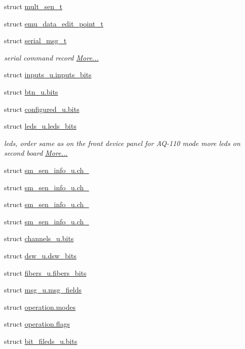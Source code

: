 \begin{DoxyCompactItemize}
struct \hyperlink{a00001_db/ddf/a00088}{mult\+\_\+sen\+\_\+t}
\item 
struct \hyperlink{a00001_dc/ddf/a00067}{emu\+\_\+data\+\_\+edit\+\_\+point\+\_\+t}
\item 
struct \hyperlink{a00001_df/dc8/a00122}{serial\+\_\+msg\+\_\+t}
\begin{DoxyCompactList}\small\item\em serial command record  \hyperlink{a00001_df/dc8/a00122}{More...}\end{DoxyCompactList}\item 
struct \hyperlink{a00001_d2/d1f/a00083}{inputs\+\_\+u.\+inputs\+\_\+bits}
\item 
struct \hyperlink{a00001_d3/d8b/a00059}{btn\+\_\+u.\+bits}
\item 
struct \hyperlink{a00001_d1/d6f/a00063}{configured\+\_\+u.\+bits}
\item 
struct \hyperlink{a00001_df/d13/a00085}{leds\+\_\+u.\+leds\+\_\+bits}
\begin{DoxyCompactList}\small\item\em leds, order same as on the front device panel for A\+Q-\/110 mode more leds on second board  \hyperlink{a00001_df/d13/a00085}{More...}\end{DoxyCompactList}\item 
struct \hyperlink{a00001_d9/d47/a00129}{sm\+\_\+sen\+\_\+info\+\_\+u.\+ch\+\_}
\item 
struct \hyperlink{a00001_d6/db3/a00130}{sm\+\_\+sen\+\_\+info\+\_\+u.\+ch\+\_}
\item 
struct \hyperlink{a00001_d7/d06/a00131}{sm\+\_\+sen\+\_\+info\+\_\+u.\+ch\+\_}
\item 
struct \hyperlink{a00001_d5/deb/a00132}{sm\+\_\+sen\+\_\+info\+\_\+u.\+ch\+\_}
\item 
struct \hyperlink{a00001_d4/de8/a00061}{channels\+\_\+u.\+bits}
\item 
struct \hyperlink{a00001_d9/db3/a00066}{dsw\+\_\+u.\+dsw\+\_\+bits}
\item 
struct \hyperlink{a00001_d1/d6e/a00073}{fibers\+\_\+u.\+fibers\+\_\+bits}
\item 
struct \hyperlink{a00001_d1/d1e/a00087}{msg\+\_\+u.\+msg\+\_\+fields}
\item 
struct \hyperlink{a00001_d1/dc1/a00092}{operation.\+modes}
\item 
struct \hyperlink{a00001_da/d82/a00091}{operation.\+flags}
\item 
struct \hyperlink{a00001_d1/d22/a00057}{bit\+\_\+fileds\+\_\+u.\+bits}

\end{DoxyCompactItemize}
